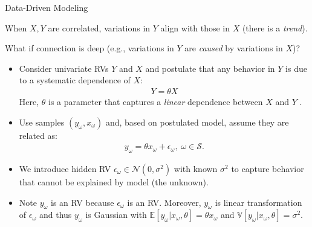 \documentclass[9pt]{beamer}
\begin{document}
%
\begin{frame}{Data-Driven Modeling}

When $X,Y$ are correlated, variations in $Y$ align with those in $X$ (there is a {\em trend}). 
\begin{block}{}
What if connection is deep (e.g., variations in $Y$ are {\em caused} by variations in $X$)? 
\end{block}

\begin{itemize}
\setlength{\itemsep}{10pt}
\item Consider univariate RVs $Y$ and $X$ and postulate that any behavior in $Y$ is due to a systematic dependence of $X$:
\begin{align*}
Y=\theta X
\end{align*}
Here, $\theta$ is a parameter that captures a {\em linear} dependence between $X$ and $Y$ . 

\item Use samples $(y_\omega,x_\omega)$ and, based on postulated model, assume they are related as:
\begin{align*}
y_\omega=\theta x_\omega + \epsilon_\omega,\; \omega \in \mathcal{S}.
\end{align*}
\item We introduce hidden RV $\epsilon_\omega\in \mathcal{N}(0,\sigma^2)$ with known $\sigma^2$ to capture behavior that cannot be explained by model (the unknown).  

\item  Note $y_\omega$ is an RV because $\epsilon_\omega$ is an RV. Moreover, $y_\omega$ is linear transformation of $\epsilon_\omega$ and thus $y_\omega$ is Gaussian with $\mathbb{E}[y_\omega|x_\omega,\theta]=\theta x_\omega$ and  $\mathbb{V}[y_\omega|x_\omega,\theta]=\sigma^2$. 

\end{itemize}

\end{frame}
\end{document}
